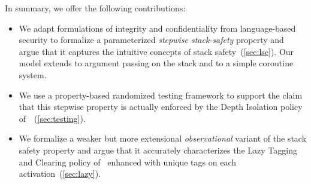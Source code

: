 \documentclass[acmsmall,review,anonymous]{acmart}\settopmatter{printfolios=true,printccs=false,printacmref=false}
\begin{document}


In summary, we offer the following contributions:
\begin{itemize}
\item
  We adapt formulations of integrity and confidentiality from language-based security
  to formalize a parameterized {\em stepwise stack-safety} property and argue that it
  captures the intuitive concepts of stack safety~(\cref{sec:lse}). Our model extends to
  argument passing on the stack and to a simple coroutine system.
\item
  We use a property-based randomized testing framework to support the claim
  that this stepwise property is actually enforced by the Depth Isolation policy
  of~\citet{DBLP:conf/sp/RoesslerD18}~(\cref{sec:testing}).
\item
  We formalize a weaker but more extensional \emph{observational} variant of the
  stack safety property and argue that it accurately characterizes
  the Lazy Tagging and Clearing policy of~\citet{DBLP:conf/sp/RoesslerD18}
  enhanced with unique tags on each activation~(\cref{sec:lazy}).
\end{itemize}
\end{document}
